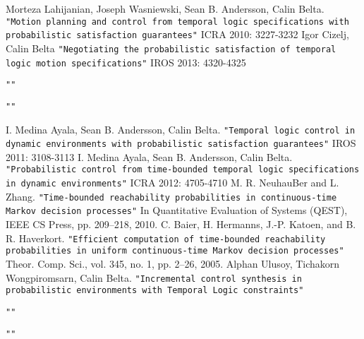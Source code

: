 \documentclass{article}
\theoremstyle{definition}
\begin{document}

\begin{thebibliography}{}
Morteza Lahijanian, Joseph Wasniewski, Sean B. Andersson, Calin Belta.
\texttt{"Motion planning and control from temporal logic specifications with probabilistic satisfaction guarantees"}
ICRA 2010: 3227-3232
Igor Cizelj, Calin Belta
\texttt{"Negotiating the probabilistic satisfaction of temporal logic motion specifications"}
IROS 2013: 4320-4325

\texttt{""}


\texttt{""}


I. Medina Ayala, Sean B. Andersson, Calin Belta.
\texttt{"Temporal logic control in dynamic environments with probabilistic satisfaction guarantees"}
IROS 2011: 3108-3113
I. Medina Ayala, Sean B. Andersson, Calin Belta.
\texttt{"Probabilistic control from time-bounded temporal logic specifications in dynamic environments"}
ICRA 2012: 4705-4710
M. R. NeuhauBer and L. Zhang.
\texttt{"Time-bounded reachability probabilities
in continuous-time Markov decision processes"}
In Quantitative Evaluation of Systems (QEST), IEEE CS Press, pp. 209–218, 2010.
C. Baier, H. Hermanns, J.-P. Katoen, and B. R. Haverkort.
\texttt{"Efficient computation of time-bounded reachability probabilities in uniform continuous-time Markov decision processes"}
Theor. Comp. Sci., vol. 345, no. 1, pp. 2–26, 2005.
Alphan Ulusoy, Tichakorn Wongpiromsarn, Calin Belta.
\texttt{"Incremental control synthesis in probabilistic environments with Temporal Logic constraints"}

\texttt{""}

\texttt{""}


\end{thebibliography}
\end{document}

